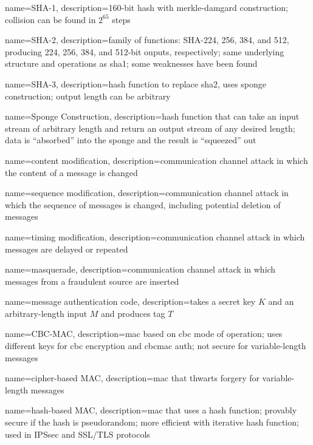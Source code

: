 {
    name={SHA-1},
    description={160-bit hash with \gls{merkle-damgard construction}; collision can be found in $2^{65}$ steps}
}

{
    name={SHA-2},
    description={family of functions: SHA-224, 256, 384, and 512, producing 224, 256, 384, and 512-bit ouputs, respectively; same underlying structure and operations as \gls{sha1}; some weaknesses have been found}
}

{
    name={SHA-3},
    description={hash function to replace \gls{sha2}, uses \gls{sponge construction}; output length can be arbitrary}
}

{
    name={Sponge Construction},
    description={hash function that can take an input stream of arbitrary length and return an output stream of any desired length; data is ``absorbed'' into the sponge and the result is ``squeezed'' out}
}

{
    name={content modification},
    description={communication channel attack in which the content of a message is changed}
}

{
    name={sequence modification},
    description={communication channel attack in which the sequence of messages is changed, including potential deletion of messages}
}

{
    name={timing modification},
    description={communication channel attack in which messages are delayed or repeated}
}

{
    name={masquerade},
    description={communication channel attack in which messages from a fraudulent source are inserted}
}

{
    name={message authentication code},
    description={takes a secret key $K$ and an arbitrary-length input $M$ and produces tag $T$}
}

{
    name={CBC-MAC},
    description={\acrshort{mac} based on \acrfull{cbc} mode of operation; uses different keys for \acrshort*{cbc} encryption and \gls*{cbcmac} auth; not secure for variable-length messages}
}

{
    name={cipher-based MAC},
    description={\acrshort{mac} that thwarts forgery for variable-length messages}
}

{
    name={hash-based MAC},
    description={\acrshort{mac} that uses a hash function; provably secure if the hash is pseudorandom; more efficient with \gls{iterative hash function}; used in IPSsec and SSL/TLS protocols}
}

